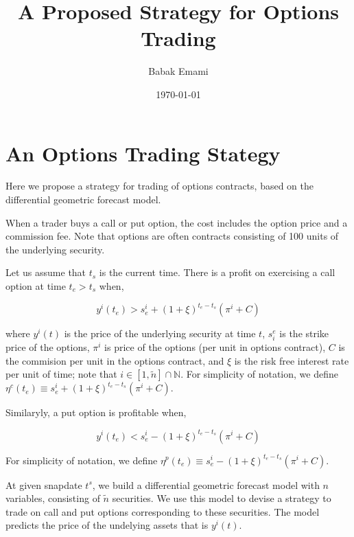 \documentclass{article}
\title{A Proposed Strategy for Options Trading}
\author{Babak Emami}
\date{\today}
\begin{document}
\maketitle

\section{An Options Trading Stategy}\label{section:options_trading}

Here we propose a strategy for trading of options contracts, based on
the differential geometric forecast model.

When a trader buys a call or put option, the cost includes the option
price and a commission fee. Note that options are often contracts
consisting of 100 units of the underlying security. 

Let us assume that $t_{s}$ is the current time. There is a profit on
exercising a call option at time $t_{e} > t_{s}$ when,

\begin{equation}\label{eqn:call-option-condition}
y^{i}(t_{e}) > s_{e}^{i} + ( 1 + \xi )^{t_{e}-t_{s}} ( \pi^{i} + C )
\end{equation}

where $y^{i}(t)$ is the price of the underlying security at time $t$,
$s^{e}_{i}$ is the strike price of the options, $\pi^{i}$ is price of
the options (per unit in options contract), $C$ is the commision per
unit in the options contract, and $\xi$ is the risk free interest rate
per unit of time; note that $i \in [1,\tilde{n}] \cap \mathbb{N}$. For
simplicity of notation, we define $\eta^{c}(t_{e}) \equiv s_{e}^{i} +
( 1 + \xi )^{t_{e}-t_{s}} ( \pi^{i} + C )$.

Similaryly, a put option is profitable when,

\begin{equation}\label{eqn:put-option-condition}
y^{i}(t_{e}) < s_{e}^{i} - ( 1 + \xi )^{t_{e}-t_{s}} ( \pi^{i} + C )
\end{equation}

For simplicity of notation, we define $\eta^{p}(t_{e}) \equiv
s_{e}^{i} - ( 1 + \xi )^{t_{e}-t_{s}} ( \pi^{i} + C )$.

At given snapdate $t^{s}$, we build a differential geometric forecast
model with $n$ variables, consisting of $\tilde{n}$ securities. We use
this model to devise a strategy to trade on call and put options
corresponding to these securities. The model predicts the price of the
undelying assets that is $y^{i}(t)$.
\end{document}
